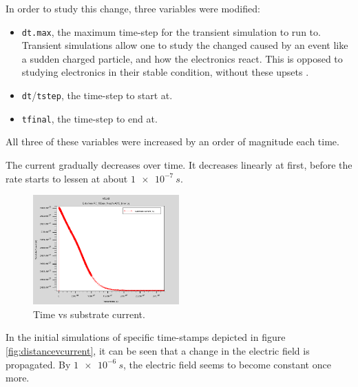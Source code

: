 \documentclass[12pt]{article}
\begin{document}
In order to study this change, three variables were modified:
\begin{itemize}
  \item \lstinline{dt.max}, the maximum time-step for the transient simulation to run to. Transient simulations allow one to study the changed caused by an event like a sudden charged particle, and how the electronics react. This is opposed to studying electronics in their stable condition, without these upsets \citep{deshpande}.
  \item \lstinline{dt}/\lstinline{tstep}, the time-step to start at.
  \item \lstinline{tfinal}, the time-step to end at.
\end{itemize}
All three of these variables were increased by an order of magnitude each time.

The current gradually decreases over time. It decreases linearly at first, before the rate starts to lessen at about $\SI{1e-7}{s}$.

\begin{figure}[H]
  \centering
  \includegraphics[width=0.5\textwidth]{timevcurrent}
  \caption{Time vs substrate current.}
\end{figure}

In the initial simulations of specific time-stamps depicted in figure \ref{fig:distancevcurrent}, it can be seen that a change in the electric field is propagated. By $\SI{1e-6}{s}$, the electric field seems to become constant once more.
\end{document}
